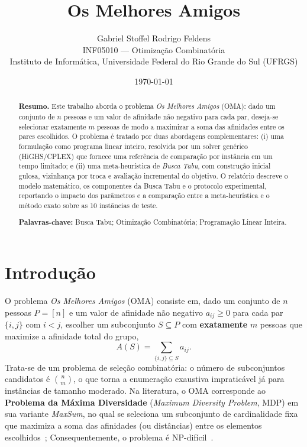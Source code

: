 \documentclass[a4paper,11pt]{article}
\title{\textbf{Os Melhores Amigos}}
\author{Gabriel Stoffel \quad Rodrigo Feldens \\
  \small INF05010 --- Otimização Combinatória \\
  \small Instituto de Informática, Universidade Federal do Rio Grande do Sul (UFRGS)}
\date{\today}
\begin{document}
\maketitle

\begin{abstract}
\noindent\textbf{Resumo.}
Este trabalho aborda o problema \emph{Os Melhores Amigos} (OMA): dado um conjunto de
$n$ pessoas e um valor de afinidade não negativo para cada par, deseja-se selecionar
exatamente $m$ pessoas de modo a maximizar a soma das afinidades entre os pares
escolhidos. O problema é tratado por duas abordagens complementares: (i) uma
formulação como programa linear inteiro, resolvida por um solver genérico
(HiGHS/CPLEX) que fornece uma referência de comparação por instância em um tempo limitado; e (ii) uma meta-heurística
de \emph{Busca Tabu}, com construção inicial gulosa, vizinhança por troca e avaliação
incremental do objetivo. O relatório descreve o modelo matemático, os componentes da
Busca Tabu e o protocolo experimental, reportando o impacto dos parâmetros e a comparação entre a meta-heurística e o método exato
sobre as 10 instâncias de teste.

\medskip
\noindent\textbf{Palavras-chave:} Busca Tabu; Otimização Combinatória; Programação Linear Inteira.
\end{abstract}

\section{Introdução}
\label{sec:intro}

O problema \emph{Os Melhores Amigos} (OMA) consiste em, dado um conjunto de
$n$ pessoas $P = [n]$ e um valor de afinidade não negativo $a_{ij} \geq 0$ para cada
par $\{i,j\}$ com $i < j$, escolher um subconjunto $S \subseteq P$ com \textbf{exatamente}
$m$ pessoas que maximize a afinidade total do grupo,
\begin{equation}
  A(S) = \sum_{\{i,j\} \subseteq S} a_{ij}.
  \label{eq:obj}
\end{equation}
Trata-se de um problema de seleção combinatória: o número de subconjuntos candidatos é
$\binom{n}{m}$, o que torna a enumeração exaustiva impraticável já para instâncias de
tamanho moderado. Na literatura, o OMA corresponde ao
\textbf{Problema da Máxima Diversidade} (\emph{Maximum Diversity Problem}, MDP) em sua
variante \emph{MaxSum}, no qual se seleciona um subconjunto de cardinalidade fixa que
maximiza a soma das afinidades (ou dist\^ancias) entre os elementos
escolhidos~\cite{kuo1993analyzing,marti2013heuristics,marti2022review}; Consequentemente, o problema é
NP-difícil~\cite{kuo1993analyzing}.
\end{document}
